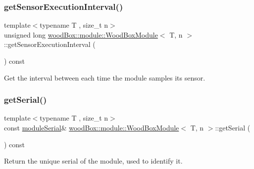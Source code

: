 \subsubsection{\texorpdfstring{get\+Sensor\+Execution\+Interval()}{getSensorExecutionInterval()}}
{\footnotesize\ttfamily template$<$typename T , size\+\_\+t n$>$ \\
unsigned long \mbox{\hyperlink{classwood_box_1_1module_1_1_wood_box_module}{wood\+Box\+::module\+::\+Wood\+Box\+Module}}$<$ T, n $>$\+::get\+Sensor\+Execution\+Interval (\begin{DoxyParamCaption}{ }\end{DoxyParamCaption}) const\hspace{0.3cm}{\ttfamily [inline]}}

Get the interval between each time the module samples its sensor. \mbox{\label{classwood_box_1_1module_1_1_wood_box_module_aa8fc11fbebc7904f144bc40b7654a215}} 
\subsubsection{\texorpdfstring{get\+Serial()}{getSerial()}}
{\footnotesize\ttfamily template$<$typename T , size\+\_\+t n$>$ \\
const \mbox{\hyperlink{classwood_box_1_1module_1_1_wood_box_module_a3a6503bbd5147a06ba50081f97177b46}{module\+Serial}}\& \mbox{\hyperlink{classwood_box_1_1module_1_1_wood_box_module}{wood\+Box\+::module\+::\+Wood\+Box\+Module}}$<$ T, n $>$\+::get\+Serial (\begin{DoxyParamCaption}{ }\end{DoxyParamCaption}) const\hspace{0.3cm}{\ttfamily [inline]}}

Return the unique serial of the module, used to identify it. \mbox{\label{classwood_box_1_1module_1_1_wood_box_module_ab2507312ea013ea5c95b8e1731ddc81d}} 
